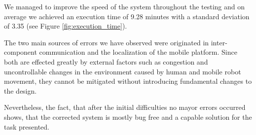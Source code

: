 We managed to improve the speed of the system throughout the testing and on average we achieved an execution time of  9.28 minutes with a standard deviation of 3.35 (see Figure \ref{fig:execution_time}).

The two main sources of errors we have observed were originated in inter-component communication and the localization of the mobile platform. Since both are effected greatly by external factors such as congestion and uncontrollable changes in the environment caused by human and mobile robot movement, they cannot be mitigated without introducing fundamental changes to the design. 

Nevertheless, the fact, that after the initial difficulties no mayor errors occurred shows, that the corrected system is mostly bug free and a capable solution for the task presented.





